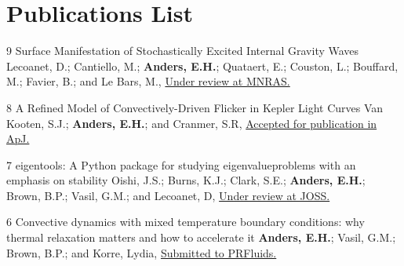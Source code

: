 \section{Publications List}

	  {9}
	  {Surface Manifestation of Stochastically Excited Internal Gravity Waves}
	  {
		Lecoanet, D.; Cantiello, M.; \textbf{Anders, E.H.}; Quataert, E.; Couston, L.; Bouffard, M.; Favier, B.; and Le Bars, M.,
		  \href{https://ui.adsabs.harvard.edu/abs/2021arXiv210504558L/abstract}{Under review at MNRAS.}
	  }

\cvpub{}
	  {8}
	  {A Refined Model of Convectively-Driven Flicker in Kepler Light Curves}
	  {
		 Van Kooten, S.J.; \textbf{Anders, E.H.}; and Cranmer, S.R,
		  \href{https://ui.adsabs.harvard.edu/abs/2021arXiv210406533V/abstract}{Accepted for publication in ApJ.}
	  }

\cvpub{}
	  {7}
	  {eigentools: A Python package for studying eigenvalueproblems with an emphasis on stability}
	  {
		Oishi, J.S.; Burns, K.J.; Clark, S.E.; \textbf{Anders, E.H.}; Brown, B.P.; Vasil, G.M.; and Lecoanet, D,
		  \href{https://github.com/openjournals/joss-reviews/issues/3079}{Under review at JOSS.}
	  }

	  {6}
	  {Convective dynamics with mixed temperature boundary conditions: why thermal relaxation matters and how to accelerate it}
	  {
		  \textbf{Anders, E.H.}; Vasil, G.M.; Brown, B.P.; and Korre, Lydia, 
		  \href{https://arxiv.org/abs/2003.00026}{Submitted to PRFluids.}
	  }

